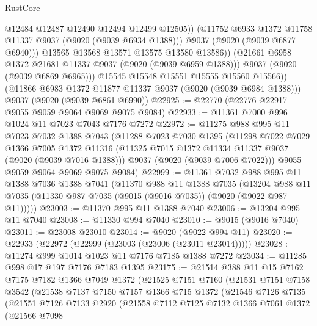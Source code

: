 \begin{lexlean}{RustCore}
\begin{coremodule}
                    @12484
                    @12487
                    @12490
                    @12494
                    @12499
                    @12505))
                (@11752 @6933 @1372 @11758 @11337 @9037 (@9020 (@9039 @6934 @1388)))
                @9037
                (@9020 (@9039 @6877 @6940)))
              @13565
              @13568
              @13571
              @13575
              @13580
              @13586))
          (@21661 @6958 @1372 @21681 @11337 @9037 (@9020 (@9039 @6959 @1388)))
          @9037
          (@9020 (@9039 @6869 @6965)))
        @15545
        @15548
        @15551
        @15555
        @15560
        @15566))
    (@11866 @6983 @1372 @11877 @11337 @9037 (@9020 (@9039 @6984 @1388)))
    @9037
    (@9020 (@9039 @6861 @6990))
@22925 := @22770 (@22776 @22917 @9055 @9059 @9064 @9069 @9075 @9084)
@22933 := @11361 @7000 @996 @1024 @11 @7023 @7043 @7176 @7272
@22972 := @11275
    @988
    @995
    @11
    @7023
    @7032
    @1388
    @7043
    (@11288
      @7023
      @7030
      @1395
      (@11298
        @7022
        @7029
        @1366
        @7005
        @1372
        @11316
        (@11325 @7015 @1372 @11334 @11337 @9037 (@9020 (@9039 @7016 @1388)))
        @9037
        (@9020 (@9039 @7006 @7022)))
      @9055
      @9059
      @9064
      @9069
      @9075
      @9084)
@22999 := @11361
    @7032
    @988
    @995
    @11
    @1388
    @7036
    @1388
    @7041
    (@11370
      @988
      @11
      @1388
      @7035
      (@13204 @988 @11 @7035 (@11330 @987 @7035 (@9015 (@9016 @7035)) (@9020 (@9022 @987 @11)))))
@23003 := @11370 @995 @11 @1388 @7040
@23006 := @13204 @995 @11 @7040
@23008 := @11330 @994 @7040
@23010 := @9015 (@9016 @7040)
@23011 := @23008 @23010
@23014 := @9020 (@9022 @994 @11)
@23020 := @22933 (@22972 (@22999 (@23003 (@23006 (@23011 @23014)))))
@23028 := @11274 @999 @1014 @1023 @11 @7176 @7185 @1388 @7272
@23034 := @11285 @998 @17 @197 @7176 @7183 @1395
@23175 := @21514
    @388
    @11
    @15
    @7162
    @7175
    @7182
    @1366
    @7049
    @1372
    (@21525
      @7151
      @7160
      (@21531
        @7151
        @7158
        @3542
        (@21538
          @7137
          @7150
          @7157
          @1366
          @715
          @1372
          (@21546
            @7126
            @7135
            (@21551
              @7126
              @7133
              @2920
              (@21558
                @7112
                @7125
                @7132
                @1366
                @7061
                @1372
                (@21566
                  @7098

\end{coremodule}
\end{lexlean}
